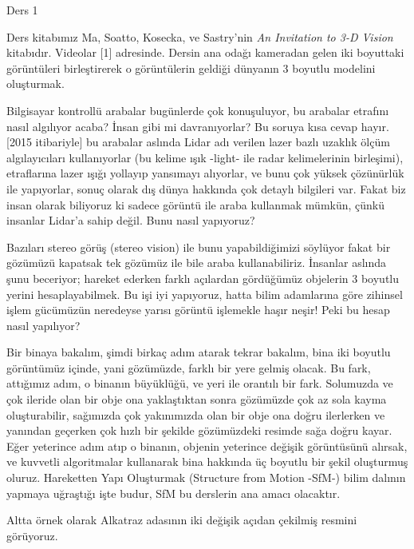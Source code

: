 \documentclass[12pt,fleqn]{article}\usepackage{../../common}
\begin{document}
Ders 1

Ders kitabımız Ma, Soatto, Kosecka, ve Sastry'nin {\em An Invitation to 3-D
  Vision} kitabıdır. Videolar [1] adresinde. Dersin ana odağı kameradan
gelen iki boyuttaki görüntüleri birleştirerek o görüntülerin geldiği
dünyanın 3 boyutlu modelini oluşturmak. 

Bilgisayar kontrollü arabalar bugünlerde çok konuşuluyor, bu arabalar
etrafını nasıl algılıyor acaba?  İnsan gibi mi davranıyorlar? Bu soruya
kısa cevap hayır. [2015 itibariyle] bu arabalar aslında Lidar adı verilen
lazer bazlı uzaklık ölçüm algılayıcıları kullanıyorlar (bu kelime ışık
-light- ile radar kelimelerinin birleşimi), etraflarına lazer ışığı
yollayıp yansımayı alıyorlar, ve bunu çok yüksek çözünürlük ile yapıyorlar,
sonuç olarak dış dünya hakkında çok detaylı bilgileri var. Fakat biz insan
olarak biliyoruz ki sadece görüntü ile araba kullanmak mümkün, çünkü
insanlar Lidar'a sahip değil. Bunu nasıl yapıyoruz?

Bazıları stereo görüş (stereo vision) ile bunu yapabildiğimizi söylüyor
fakat bir gözümüzü kapatsak tek gözümüz ile bile araba
kullanabiliriz. İnsanlar aslında şunu beceriyor; hareket ederken farklı
açılardan gördüğümüz objelerin 3 boyutlu yerini hesaplayabilmek. Bu işi iyi
yapıyoruz, hatta bilim adamlarına göre zihinsel işlem gücümüzün neredeyse
yarısı görüntü işlemekle haşır neşir! Peki bu hesap nasıl yapılıyor?

Bir binaya bakalım, şimdi birkaç adım atarak tekrar bakalım, bina iki
boyutlu görüntümüz içinde, yani gözümüzde, farklı bir yere gelmiş
olacak. Bu fark, attığımız adım, o binanın büyüklüğü, ve yeri ile orantılı
bir fark. Solumuzda ve çok ileride olan bir obje ona yaklaştıktan sonra
gözümüzde çok az sola kayma oluşturabilir, sağımızda çok yakınımızda olan
bir obje ona doğru ilerlerken ve yanından geçerken çok hızlı bir şekilde
gözümüzdeki resimde sağa doğru kayar. Eğer yeterince adım atıp o binanın,
objenin yeterince değişik görüntüsünü alırsak, ve kuvvetli algoritmalar
kullanarak bina hakkında üç boyutlu bir şekil oluşturmuş oluruz. Hareketten
Yapı Oluşturmak (Structure from Motion -SfM-) bilim dalının yapmaya
uğraştığı işte budur, SfM bu derslerin ana amacı olacaktır.

Altta örnek olarak Alkatraz adasının iki değişik açıdan çekilmiş resmini
görüyoruz. 
\end{document}
